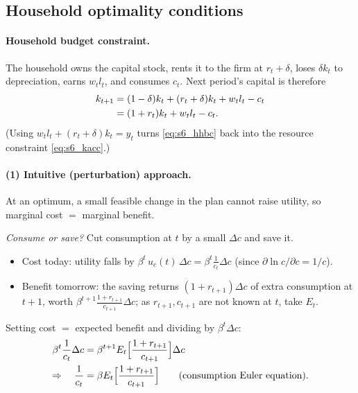 \subsection{Household optimality conditions }

\paragraph{Household budget constraint.} The household owns the capital stock, rents it to the firm at $r_t+\delta$, loses $\delta k_t$ to depreciation, earns $w_tl_t$, and consumes $c_t$. Next period's capital is therefore
\begin{align}
k_{t+1}&=(1-\delta)k_t+(r_t+\delta)k_t+w_tl_t-c_t\notag\\
&=(1+r_t)k_t+w_tl_t-c_t . \label{eq:s6_hhbc}
\end{align}
(Using $w_tl_t+(r_t+\delta)k_t=y_t$ turns \eqref{eq:s6_hhbc} back into the resource constraint \eqref{eq:s6_kacc}.)

\paragraph{(1) Intuitive (perturbation) approach.} At an optimum, a small feasible change in the plan cannot raise utility, so marginal cost $=$ marginal benefit.

\emph{Consume or save?} Cut consumption at $t$ by a small $\Delta c$ and save it.
\begin{itemize}
  \item Cost today: utility falls by $\beta^t\,u_c(t)\,\Delta c=\beta^t\frac{1}{c_t}\Delta c$ (since $\partial\ln c/\partial c=1/c$).
  \item Benefit tomorrow: the saving returns $(1+r_{t+1})\Delta c$ of extra consumption at $t+1$, worth $\beta^{t+1}\frac{1+r_{t+1}}{c_{t+1}}\Delta c$; as $r_{t+1},c_{t+1}$ are not known at $t$, take $E_t$.
\end{itemize}
Setting cost $=$ expected benefit and dividing by $\beta^t\Delta c$:
\begin{align}
\beta^t\frac{1}{c_t}\Delta c&=\beta^{t+1}E_t\Big[\frac{1+r_{t+1}}{c_{t+1}}\Big]\Delta c\notag\\
\Rightarrow\quad \frac1{c_t}&=\beta E_t\Big[\frac{1+r_{t+1}}{c_{t+1}}\Big]\qquad\text{(consumption Euler equation).}\label{eq:s6_euler}
\end{align}

